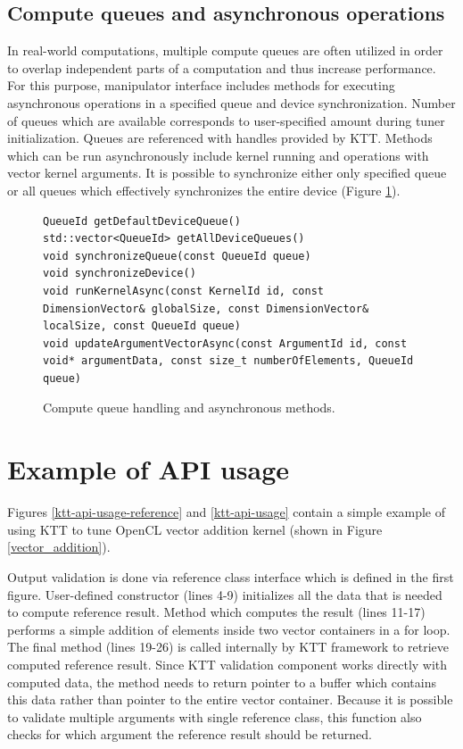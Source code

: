 \documentclass
[
    digital, %
    oneside, %
    table, %
    nolof, %
    nolot, %
    nocover %
]{fithesis3}
\begin{document}
\subsection{Compute queues and asynchronous operations}
In real-world computations, multiple compute queues are often utilized in order to overlap independent parts of a computation and thus increase
performance. For this purpose, manipulator interface includes methods for executing asynchronous operations in a specified queue and device synchronization.
Number of queues which are available corresponds to user-specified amount during tuner initialization. Queues are referenced with handles provided by KTT.
Methods which can be run asynchronously include kernel running and operations with vector kernel arguments. It is possible to synchronize either only
specified queue or all queues which effectively synchronizes the entire device (Figure \ref{ktt-manipulator-asynchronous-methods}).

\begin{figure}
\begin{adjustwidth}{-1cm}{-1cm}
\begin{lstlisting}
QueueId getDefaultDeviceQueue()
std::vector<QueueId> getAllDeviceQueues()
void synchronizeQueue(const QueueId queue)
void synchronizeDevice()
void runKernelAsync(const KernelId id, const DimensionVector& globalSize, const DimensionVector& localSize, const QueueId queue)
void updateArgumentVectorAsync(const ArgumentId id, const void* argumentData, const size_t numberOfElements, QueueId queue)
\end{lstlisting}
\caption{Compute queue handling and asynchronous methods.}
\label{ktt-manipulator-asynchronous-methods}
\end{adjustwidth}
\end{figure}

\section{Example of API usage}
\label{ktt-simple-usage}
Figures \ref{ktt-api-usage-reference} and \ref{ktt-api-usage} contain a simple example of using KTT to tune OpenCL vector addition kernel (shown in
Figure \ref{vector_addition}).

Output validation is done via reference class interface which is defined in the first figure. User-defined constructor (lines 4-9) initializes all
the data that is needed to compute reference result. Method which computes the result (lines 11-17) performs a simple addition of elements inside
two vector containers in a for loop. The final method (lines 19-26) is called internally by KTT framework to retrieve computed reference result.
Since KTT validation component works directly with computed data, the method needs to return pointer to a buffer which contains this data rather than
pointer to the entire vector container. Because it is possible to validate multiple arguments with single reference class, this function also checks
for which argument the reference result should be returned.
\end{document}
